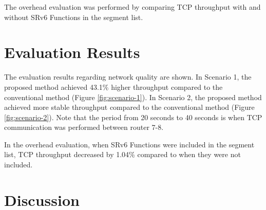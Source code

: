 \documentclass[conference]{IEEEtran}
\begin{document}
The overhead evaluation was performed by comparing TCP throughput with and without SRv6 Functions in the segment list.

\section{Evaluation Results}


The evaluation results regarding network quality are shown.
In Scenario 1, the proposed method achieved 43.1\% higher throughput compared to the conventional method (Figure \ref{fig:scenario-1}).
In Scenario 2, the proposed method achieved more stable throughput compared to the conventional method (Figure \ref{fig:scenario-2}).
Note that the period from 20 seconds to 40 seconds is when TCP communication was performed between router 7-8.

In the overhead evaluation, when SRv6 Functions were included in the segment list, TCP throughput decreased by 1.04\% compared to when they were not included.


\section{Discussion}
\end{document}
